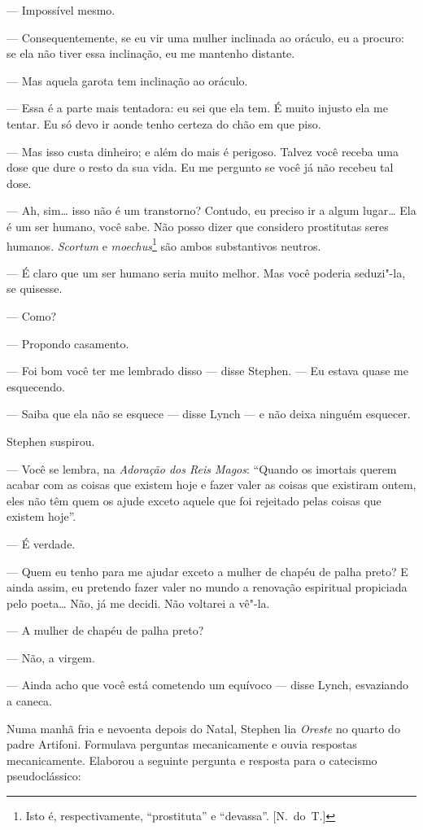 --- Impossível mesmo.

--- Consequentemente, se eu vir uma mulher inclinada ao oráculo, eu a procuro:
se ela não tiver essa inclinação, eu me mantenho distante.

--- Mas aquela garota tem inclinação ao oráculo.

--- Essa é a parte mais tentadora: eu sei que ela tem.  É muito injusto ela me
tentar.  Eu só devo ir aonde tenho certeza do chão em que piso.

--- Mas isso custa dinheiro; e além do mais é perigoso.  Talvez você receba uma
dose que dure o resto da sua vida.  Eu me pergunto se você já não recebeu tal
dose.

--- Ah, sim\ldots{} isso não é um transtorno?  Contudo, eu preciso ir a algum
lugar\ldots{}  Ela é um ser humano, você sabe.  Não posso dizer que considero
prostitutas seres humanos.  \textit{Scortum} e \textit{moechus}\footnote{ Isto
é, respectivamente, “prostituta” e “devassa”. [N.~do~T.]} são ambos substantivos
neutros.

--- É claro que um ser humano seria muito melhor.  Mas você poderia seduzi"-la,
se quisesse.

--- Como?

--- Propondo casamento.

--- Foi bom você ter me lembrado disso --- disse Stephen.  --- Eu estava quase
me esquecendo.

--- Saiba que ela não se esquece --- disse Lynch --- e não deixa ninguém
esquecer.

Stephen suspirou.

--- Você se lembra, na \textit{Adoração dos Reis Magos}: “Quando os imortais
querem acabar com as coisas que existem hoje e fazer valer as coisas que
existiram ontem, eles não têm quem os ajude exceto aquele que foi rejeitado
pelas coisas que existem hoje”.

--- É verdade.

--- Quem eu tenho para me ajudar exceto a mulher de chapéu de palha preto?  E
ainda assim, eu pretendo fazer valer no mundo a renovação espiritual propiciada
pelo poeta\ldots{}  Não, já me decidi.  Não voltarei a vê"-la.

--- A mulher de chapéu de palha preto?

--- Não, a virgem.

--- Ainda acho que você está cometendo um equívoco --- disse Lynch, esvaziando
a caneca.

Numa manhã fria e nevoenta depois do Natal, Stephen lia \textit{Oreste} no		
quarto do padre Artifoni.  Formulava perguntas mecanicamente e ouvia respostas
mecanicamente.  Elaborou a seguinte pergunta e resposta para o catecismo
pseudoclássico:

